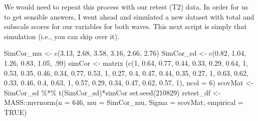 \documentclass[
  english,
]{book}
\newenvironment{Shaded}{\begin{snugshade}}{\end{snugshade}}
\newcommand{\AttributeTok}[1]{\textcolor[rgb]{0.77,0.63,0.00}{#1}}
\newcommand{\ConstantTok}[1]{\textcolor[rgb]{0.00,0.00,0.00}{#1}}
\newcommand{\DecValTok}[1]{\textcolor[rgb]{0.00,0.00,0.81}{#1}}
\newcommand{\FloatTok}[1]{\textcolor[rgb]{0.00,0.00,0.81}{#1}}
\newcommand{\FunctionTok}[1]{\textcolor[rgb]{0.00,0.00,0.00}{#1}}
\newcommand{\NormalTok}[1]{#1}
\newcommand{\OtherTok}[1]{\textcolor[rgb]{0.56,0.35,0.01}{#1}}
\newcommand{\SpecialCharTok}[1]{\textcolor[rgb]{0.00,0.00,0.00}{#1}}
\begin{document}
We would need to repeat this process with our retest (T2) data. In order for us to get sensible answers, I went ahead and simulated a new dataset with total and subscale scores for our variables for both waves. This next script is simply that simulation (i.e., you can skip over it).

\begin{Shaded}
\begin{Highlighting}[]
\NormalTok{SimCor\_mu }\OtherTok{\textless{}{-}} \FunctionTok{c}\NormalTok{(}\FloatTok{3.13}\NormalTok{, }\FloatTok{2.68}\NormalTok{, }\FloatTok{3.58}\NormalTok{, }\FloatTok{3.16}\NormalTok{, }\FloatTok{2.66}\NormalTok{, }\FloatTok{2.76}\NormalTok{)}
\NormalTok{SimCor\_sd }\OtherTok{\textless{}{-}} \FunctionTok{c}\NormalTok{(}\FloatTok{0.82}\NormalTok{, }\FloatTok{1.04}\NormalTok{, }\FloatTok{1.26}\NormalTok{, }\FloatTok{0.83}\NormalTok{, }\FloatTok{1.05}\NormalTok{, .}\DecValTok{99}\NormalTok{)}
\NormalTok{simCor }\OtherTok{\textless{}{-}} \FunctionTok{matrix}\NormalTok{ (}\FunctionTok{c}\NormalTok{(}\DecValTok{1}\NormalTok{,  }\FloatTok{0.64}\NormalTok{,   }\FloatTok{0.77}\NormalTok{,   }\FloatTok{0.44}\NormalTok{,   }\FloatTok{0.33}\NormalTok{,   }\FloatTok{0.29}\NormalTok{,}
                    \FloatTok{0.64}\NormalTok{,   }\DecValTok{1}\NormalTok{,  }\FloatTok{0.53}\NormalTok{,   }\FloatTok{0.35}\NormalTok{,   }\FloatTok{0.46}\NormalTok{,   }\FloatTok{0.34}\NormalTok{,}
                    \FloatTok{0.77}\NormalTok{,   }\FloatTok{0.53}\NormalTok{,   }\DecValTok{1}\NormalTok{,  }\FloatTok{0.27}\NormalTok{,   }\FloatTok{0.4}\NormalTok{,    }\FloatTok{0.47}\NormalTok{,}
                    \FloatTok{0.44}\NormalTok{,   }\FloatTok{0.35}\NormalTok{,   }\FloatTok{0.27}\NormalTok{,   }\DecValTok{1}\NormalTok{,  }\FloatTok{0.63}\NormalTok{,   }\FloatTok{0.62}\NormalTok{,}
                    \FloatTok{0.33}\NormalTok{,   }\FloatTok{0.46}\NormalTok{,   }\FloatTok{0.4}\NormalTok{,    }\FloatTok{0.63}\NormalTok{,   }\DecValTok{1}\NormalTok{,  }\FloatTok{0.57}\NormalTok{,}
                    \FloatTok{0.29}\NormalTok{,   }\FloatTok{0.34}\NormalTok{,   }\FloatTok{0.47}\NormalTok{,   }\FloatTok{0.62}\NormalTok{,   }\FloatTok{0.57}\NormalTok{,   }\DecValTok{1}\NormalTok{),}
                  \AttributeTok{ncol =} \DecValTok{6}\NormalTok{)}
\NormalTok{scovMat }\OtherTok{\textless{}{-}}\NormalTok{ SimCor\_sd }\SpecialCharTok{\%*\%} \FunctionTok{t}\NormalTok{(SimCor\_sd)}\SpecialCharTok{*}\NormalTok{simCor}
\FunctionTok{set.seed}\NormalTok{(}\DecValTok{210829}\NormalTok{)}
\NormalTok{retest\_df }\OtherTok{\textless{}{-}}\NormalTok{ MASS}\SpecialCharTok{::}\FunctionTok{mvrnorm}\NormalTok{(}\AttributeTok{n =} \DecValTok{646}\NormalTok{, }\AttributeTok{mu =}\NormalTok{ SimCor\_mu, }\AttributeTok{Sigma =}\NormalTok{ scovMat, }\AttributeTok{empirical =} \ConstantTok{TRUE}\NormalTok{)}

\end{Highlighting}
\end{Shaded}
\end{document}
